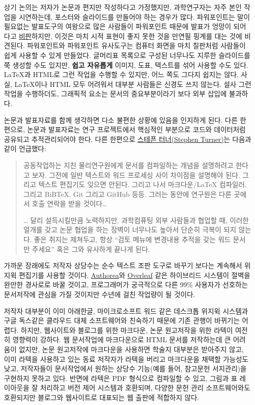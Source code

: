 \documentclass[
  letterpaper,
]{book}
\begin{document}
상기 논의는 저자가 논문과 편지만 작성하다고 가정했지만, 과학연구자는
자주 본인 작업을 시연하는데, 포스터와 슬라이드를 만들어야 하는 경우가
많다. 파워포인트는 말이 필요없는 발표도구의 여왕으로 많은 사람들이
파워포인트 때문에 발표가 엉망이 되어다고
\href{http://www.edwardtufte.com/tufte/powerpoint}{비판}하지만, 이것은
마치 시적 표현이 좋지 못한 것을 만연필 핑계를 대는 것에 비견된다.
파워포인트와 파워포인트 유사도구는 컴퓨터 화면을 마치 칠판처럼 사람들이
쉽게 사용할 수 있게 만들었다. 글머리표 목록으로 구성된 너무나도 지루한
슬라이드를 쭉 생성할 수도 있지만, \textbf{쉽고 자유롭게} 이미지, 도표,
텍스트를 섞어 사용할 수도 있다. LaTeX과 HTML로 그런 작업을 수행할 수
있지만, 어느 쪽도 그다지 쉽지는 않다. 사실, LaTeX이나 HTML 모두 어려워서
대부분 사람들은 신경도 쓰지 않는다. 설사 그런 작업을 수행하더도,
그래픽적 요소는 문서의 중요부분이라기 보다 외부 삽입에 불과하다.

논문과 발표자료를 함께 생각하면 다소 불편한 상황에 있음을 인지하게 된다.
다른 한편으로, 논문과 발표자료는 연구 프로젝트에서 핵심적인 부분으로
코드와 데이터처럼 공유되고 추적관리되어야 한다. 다른 한편으로
\href{https://github.com/swcarpentry/good-enough-practices-in-scientific-computing/issues/2\#issue-116784345}{스테픈
터너(Stephen Turner)}는 다음과 같이 언급했다:

\begin{quote}
공동작업하는 지친 물리연구원에게 문서를 컴파일하는 개념을 설명하려고
한다고 보자. 그전에 일반 텍스트와 워드 프로세싱 사이 차이점을 설명해야
된다. 그리고 텍스트 편집기도 잊으면 안된다. 그리고 나서 마크다운/LaTeX
컴파일러. 그리고 BiBTeX. Git 그리고 GitHub 등등. 그러는 동안에 연구원은
다른 곳에서 호출 연락을 받을 것이다\ldots{}

\ldots{} 달리 설득시킬만큼 노력하지만, 과학컴퓨팅 외부 사람들과 협업할
때, 이러한 얼개를 갖고 논문 협업을 하는 장벽이 너무나도 높아서 단순히
극복이 되지 않는다. 좋은 취지는 제쳐두고, 항상 ``검토 메뉴에 변경내용
추적을 갖는 워드 문서만 주세요'' 혹은 그와 유사하게 끝나게 된다.
\end{quote}

가까운 장래에도 저작자 상당수는 순수 텍스트 조판 도구로 바꾸기 보다는
계속해서 위지윅 편집기를 사용할 것이다.
\href{https://www.authorea.com/}{Authorea}와
\href{https://www.overleaf.com/}{Overleaf} 같은 하이브리드 시스템이
절벽을 완만한 경사로로 바꿀 것이고, 프로그래머가 궁극적으로 다른 99\%
사용자가 선호하는 문서저작에 관심을 가질 것이지만 수년에 걸친 작업량이
될 것이다.

저작자 대부분이 이미 아래한글, 마이크로소프트 워드 같은 데스크톱 위지윅
시스템과 구글 독스같은 클라우드 대체 소프트웨어와 친숙하기 때문에 기존
관행이 바뀌기는 어렵다. 하지만, 웹사이트와 블로그를 위한 마크다운, 논문
원고저작을 위한 라텍이 여전히 영향력이 강하다. 웹 문서작업에
마크다운으로 HTML 문서를 저작하는데 큰 어려움이 없지만, 논문 원고저작에
마크다운을 사용하면 학술지 대부분은 받아주지 않고, 이미 라텍을 사용하고
있는 동료 저작자가 라텍을 버리고 마크다운을 채택할 가능성도 낮고,
저작자들이 문서작업에서 원하는 상당수 기능(예를 들어, 참고문헌
서지관리)을 구현하지 못하고 있다. 반면에 라텍은 PDF 형식으로 컴파일할 수
있고, 그림과 표 레이아웃을 잘 처리하고 버전 제어 시스템과 호환되며,
다양한 문헌 관리 소프트웨어와도 호환되지만 블로그와 웹사이트로 대표되는
웹 출판에 적합하지 않다.
\end{document}
